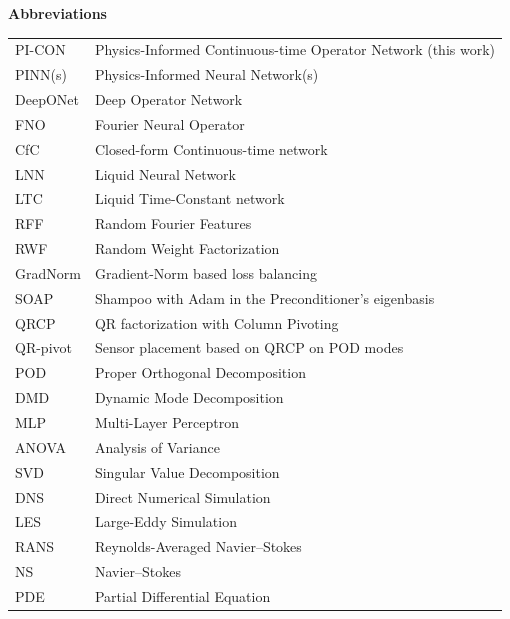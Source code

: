 \noindent\textbf{Abbreviations}
\vspace{0.5em}

{\renewcommand{\arraystretch}{0.72}%
\noindent\begin{tabularx}{\textwidth}{@{}>{\raggedright\arraybackslash}p{2.8cm} >{\raggedright\arraybackslash}X@{}}
PI-CON   & Physics-Informed Continuous-time Operator Network (this work) \\
PINN(s)  & Physics-Informed Neural Network(s) \\
DeepONet & Deep Operator Network \\
FNO      & Fourier Neural Operator \\
CfC      & Closed-form Continuous-time network \\
LNN      & Liquid Neural Network \\
LTC      & Liquid Time-Constant network \\
RFF      & Random Fourier Features \\
RWF      & Random Weight Factorization \\
GradNorm & Gradient-Norm based loss balancing \\
SOAP     & Shampoo with Adam in the Preconditioner's eigenbasis \\
QRCP     & QR factorization with Column Pivoting \\
QR-pivot & Sensor placement based on QRCP on POD modes \\
POD      & Proper Orthogonal Decomposition \\
DMD      & Dynamic Mode Decomposition \\
MLP      & Multi-Layer Perceptron \\
ANOVA    & Analysis of Variance \\
SVD      & Singular Value Decomposition \\
DNS      & Direct Numerical Simulation \\
LES      & Large-Eddy Simulation \\
RANS     & Reynolds-Averaged Navier--Stokes \\
NS       & Navier--Stokes \\
PDE      & Partial Differential Equation \\

\end{tabularx}}
